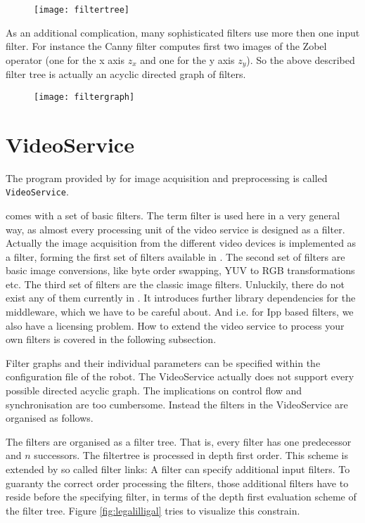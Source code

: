 \begin{figure}[!ht]
  \begin{center}
    \texttt{[image: filtertree]}
  \end{center}
\end{figure}

As an additional complication, many sophisticated filters use more
then one input filter. For instance the Canny filter computes first
two images of the Zobel operator (one for the x axis $z_x$ and one for the y
axis $z_y$). So the above described filter tree is actually an acyclic
directed graph of filters.

\begin{figure}[!ht]
  \begin{center}
    \texttt{[image: filtergraph]}
  \end{center}
\end{figure}

\section{VideoService}

The program provided by \miro for image acquisition and preprocessing
is called {\tt VideoService}.

\miro comes with a set of basic filters. The term filter is used here
in a very general way, as almost every processing unit of the video
service is designed as a filter. Actually the image acquisition from
the different video devices is implemented as a filter, forming the
first set of filters available in \miro. The second set of filters are
basic image conversions, like byte order swapping, YUV to RGB
transformations etc. The third set of filters are the classic image
filters. Unluckily, there do not exist any of them currently in \miro.
It introduces further library dependencies for the middleware, which
we have to be careful about. And i.e. for Ipp based filters, we also
have a licensing problem. How to extend the video service to process
your own filters is covered in the following subsection.

Filter graphs and their individual parameters can be specified within
the configuration file of the robot. The VideoService actually does
not support every possible directed acyclic graph. The implications on
control flow and synchronisation are too cumbersome. Instead the
filters in the VideoService are organised as follows.

The filters are organised as a filter tree. That is, every filter has
one predecessor and $n$ successors. The filtertree is processed in
depth first order. This scheme is extended by so called filter
links: A filter can specify additional input filters. To guaranty the
correct order processing the filters, those additional filters have to
reside before the specifying filter, in terms of the depth first
evaluation scheme of the filter tree. Figure \ref{fig:legalilligal}
tries to visualize this constrain.

